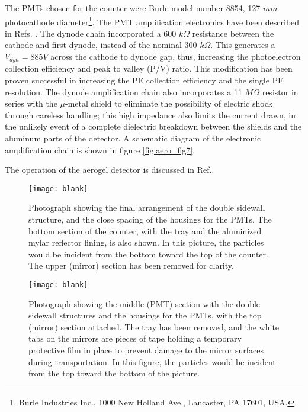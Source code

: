 The PMTs chosen for the counter were Burle model number 8854, 127 $mm$
photocathode 
diameter\footnote{Burle Industries Inc., 1000 New Holland Ave., Lancaster, PA 17601, USA.}.
  The PMT amplification electronics have
been described in Refs. \cite{Alexa:1995ne,Lolos:1997vz}.  The dynode chain incorporated a
600 $k\Omega$ resistance between the cathode and first dynode, instead of the
nominal 300 $k\Omega$.  This generates a $V_{dyn}=885 V$ across the cathode to
dynode gap, thus, increasing the photoelectron collection efficiency and peak
to valley (P/V) ratio.  This modification has been proven successful in
increasing the PE collection efficiency and the single PE resolution.  The
dynode amplification chain also incorporates a 11 $M\Omega$ resistor in series
with the $\mu$-metal shield to eliminate the possibility of electric shock
through careless handling; this high impedance also limits the current drawn,
in the unlikely event of a complete dielectric breakdown between the shields
and the aluminum parts of the detector. A schematic diagram of the electronic 
amplification chain is shown in figure \ref{fig:aero_fig7}. 

The operation of the aerogel detector is discussed in Ref.\cite{Brash:2002vn}.

\begin{figure}[p]
\texttt{[image: blank]}
\caption[Aerogel: structure]{
 Photograph showing the final arrangement of the double sidewall
 structure, and the close spacing of the housings for the PMTs.  The bottom
 section of the counter, with the tray and the aluminized mylar reflector
 lining, is also shown.  In this picture, the particles would be incident from
 the bottom toward the top of the counter.  The upper (mirror) section has been
 removed for clarity.
 }
\label{fig:aero_fig3}
\end{figure}

\begin{figure}[p]
\texttt{[image: blank]}
\caption[Aerogel: middle PMT]{
 Photograph showing the middle (PMT) section with the double sidewall
 structures and the housings for the PMTs, with the top (mirror) section
 attached.  The tray has been removed, and the white tabs on the mirrors are
 pieces of tape holding a temporary protective film in place to prevent damage
 to the mirror surfaces during transportation.  In this figure, the particles
 would be incident from the top toward the bottom of the picture.
 }
\label{fig:aero_fig4}
\end{figure}

